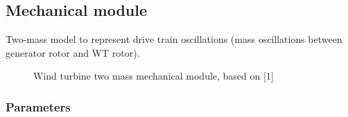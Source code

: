 \documentclass[
  a4paper,
  DIV=11,
  numbers=noendperiod]{scrartcl}
\begin{document}
\subsection{Mechanical module}\label{sec-mechanicalModule}

Two-mass model to represent drive train oscillations (mass oscillations
between generator rotor and WT rotor).

\begin{figure}


\caption{\label{fig-mechanicalModule}Wind turbine two mass mechanical
module, based on {[}1{]}}

\end{figure}%

\subsubsection{Parameters}\label{parameters-3}
\end{document}
